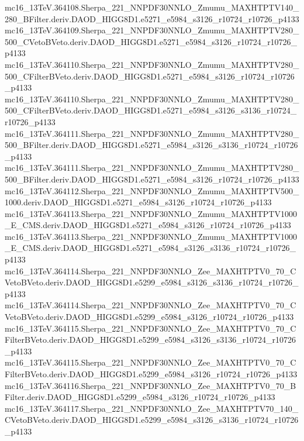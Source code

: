 \begin{footnotesize}
mc16\_13TeV.364108.Sherpa\_221\_NNPDF30NNLO\_Zmumu\_MAXHTPTV140\_280\_BFilter.deriv.DAOD\_HIGG8D1.e5271\_e5984\_s3126\_r10724\_r10726\_p4133 \\
mc16\_13TeV.364109.Sherpa\_221\_NNPDF30NNLO\_Zmumu\_MAXHTPTV280\_500\_CVetoBVeto.deriv.DAOD\_HIGG8D1.e5271\_e5984\_s3126\_r10724\_r10726\_p4133 \\
mc16\_13TeV.364110.Sherpa\_221\_NNPDF30NNLO\_Zmumu\_MAXHTPTV280\_500\_CFilterBVeto.deriv.DAOD\_HIGG8D1.e5271\_e5984\_s3126\_r10724\_r10726\_p4133 \\
mc16\_13TeV.364110.Sherpa\_221\_NNPDF30NNLO\_Zmumu\_MAXHTPTV280\_500\_CFilterBVeto.deriv.DAOD\_HIGG8D1.e5271\_e5984\_s3126\_s3136\_r10724\_r10726\_p4133 \\
mc16\_13TeV.364111.Sherpa\_221\_NNPDF30NNLO\_Zmumu\_MAXHTPTV280\_500\_BFilter.deriv.DAOD\_HIGG8D1.e5271\_e5984\_s3126\_s3136\_r10724\_r10726\_p4133 \\
mc16\_13TeV.364111.Sherpa\_221\_NNPDF30NNLO\_Zmumu\_MAXHTPTV280\_500\_BFilter.deriv.DAOD\_HIGG8D1.e5271\_e5984\_s3126\_r10724\_r10726\_p4133 \\
mc16\_13TeV.364112.Sherpa\_221\_NNPDF30NNLO\_Zmumu\_MAXHTPTV500\_1000.deriv.DAOD\_HIGG8D1.e5271\_e5984\_s3126\_r10724\_r10726\_p4133 \\
mc16\_13TeV.364113.Sherpa\_221\_NNPDF30NNLO\_Zmumu\_MAXHTPTV1000\_E\_CMS.deriv.DAOD\_HIGG8D1.e5271\_e5984\_s3126\_r10724\_r10726\_p4133 \\
mc16\_13TeV.364113.Sherpa\_221\_NNPDF30NNLO\_Zmumu\_MAXHTPTV1000\_E\_CMS.deriv.DAOD\_HIGG8D1.e5271\_e5984\_s3126\_s3136\_r10724\_r10726\_p4133 \\
mc16\_13TeV.364114.Sherpa\_221\_NNPDF30NNLO\_Zee\_MAXHTPTV0\_70\_CVetoBVeto.deriv.DAOD\_HIGG8D1.e5299\_e5984\_s3126\_s3136\_r10724\_r10726\_p4133 \\
mc16\_13TeV.364114.Sherpa\_221\_NNPDF30NNLO\_Zee\_MAXHTPTV0\_70\_CVetoBVeto.deriv.DAOD\_HIGG8D1.e5299\_e5984\_s3126\_r10724\_r10726\_p4133 \\
mc16\_13TeV.364115.Sherpa\_221\_NNPDF30NNLO\_Zee\_MAXHTPTV0\_70\_CFilterBVeto.deriv.DAOD\_HIGG8D1.e5299\_e5984\_s3126\_s3136\_r10724\_r10726\_p4133 \\
mc16\_13TeV.364115.Sherpa\_221\_NNPDF30NNLO\_Zee\_MAXHTPTV0\_70\_CFilterBVeto.deriv.DAOD\_HIGG8D1.e5299\_e5984\_s3126\_r10724\_r10726\_p4133 \\
mc16\_13TeV.364116.Sherpa\_221\_NNPDF30NNLO\_Zee\_MAXHTPTV0\_70\_BFilter.deriv.DAOD\_HIGG8D1.e5299\_e5984\_s3126\_r10724\_r10726\_p4133 \\
mc16\_13TeV.364117.Sherpa\_221\_NNPDF30NNLO\_Zee\_MAXHTPTV70\_140\_CVetoBVeto.deriv.DAOD\_HIGG8D1.e5299\_e5984\_s3126\_s3136\_r10724\_r10726\_p4133 \\

\end{footnotesize}
